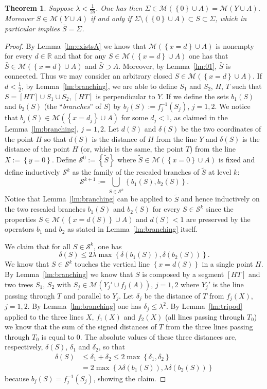 \documentclass{amsart}
\newcommand{\RR}{\mathbb R}
\newcommand{\ENCLOSE}[1]{\left\{#1\right\}}
\newcommand{\M}{\mathcal{M}}
\renewcommand{\S}{\mathcal{S}}
\newtheorem{theorem}{Theorem}[section]
\theoremstyle{definition}
\theoremstyle{remark}
\begin{document}
\begin{theorem}\label{th:main}
Suppose $\lambda < \frac 1{25}$.
One has then $\Sigma \in \M(\ENCLOSE{0}\cup A) = \M(Y\cup A)$.
Moreover $S\in \M(Y\cup A)$ if and only if 
$\Sigma\setminus (\ENCLOSE{0}\cup A)\subset S\subset \Sigma$,
which in particular implies $\bar S=\Sigma$.
\end{theorem}
%
\begin{proof}
By Lemma~\ref{lm:existsA} we know that $\M(\ENCLOSE{x=d}\cup A)$
is nonempty for every $d\in \RR$ and
that for any $S\in \M(\ENCLOSE{x=d}\cup A)$ 
one has that $\bar S\in \M(\ENCLOSE{x=d}\cup A)$ and $\bar S\supset A$.
Moreover, by Lemma~\ref{lm:01},
$\bar S$ is connected.
Thus we may consider an arbitrary closed $S\in \M(\ENCLOSE{x=d}\cup A)$.
If $d<\frac 1 2$, 
by Lemma~\ref{lm:branching}, 
we are able to define $S_1$ and $S_2$, $H$, $T$
such that 
$S=[H T] \cup S_1 \cup S_2$, $[HT]$ is perpendicular to $Y$.
If we define the sets $b_1(S)$ and $b_2(S)$ 
(the ``\emph{branches}'' of $S$) 
by $b_j(S) := f_j^{-1}(S_j)$, $j=1,2$.
We notice that $b_j(S)\in \M(\ENCLOSE{x=d_j}\cup A)$ for some $d_j<1$, 
as claimed in the Lemma~\ref{lm:branching}, $j=1,2$.
Let $d(S)$ and $\delta(S)$ be the two coordinates of the point $H$ 
so that $d(S)$ is the distance of $H$ from the line $Y$ 
and $\delta(S)$ is the distance of the point $H$
(or, which is the same, the point $T$) 
from the line $X:=\ENCLOSE{y=0}$.
Define $\S^0:=\ENCLOSE{\tilde S}$ where $\tilde S\in \M(\ENCLOSE{x=0}\cup A)$ 
is fixed
and define inductively $\S^k$ as the family of the rescaled branches of $\tilde S$ 
at level $k$:
\[
  \S^{k+1} := \bigcup_{S\in \S^k}\ENCLOSE{b_1(S),b_2(S)}.
\]
Notice that Lemma~\ref{lm:branching} can be applied to $\tilde S$ and 
hence inductively on the two rescaled branches 
$b_1(S)$ and $b_2(S)$ for every $S\in \S^k$
since the properties 
$S \in \M(\ENCLOSE{x=d(S)}\cup A)$ and $d(S)<1$
are preserved by the operators $b_1$ and $b_2$
as stated in Lemma~\ref{lm:branching} itself.

We claim that for all $S\in \S^k$, one has 
\[
  \delta(S)\le 2\lambda \max\ENCLOSE{\delta(b_1(S)),
    \delta(b_2(S))}.
\]
We know that $S\in \S^k$ touches the vertical line $\ENCLOSE{x=d(S)}$ 
in a single point $H$.
By Lemma~\ref{lm:branching} we know that $S$ is composed 
by a segment $[H T]$ and two trees $S_1$, $S_2$
with $S_j\in \M(Y_j'\cup f_j(A))$, $j=1,2$
where $Y_j'$ is the line passing through $T$ and parallel to $Y_j$.
Let $\delta_j$ be the distance of $T$ from $f_j(X)$, $j=1,2$.
By Lemma~\ref{lm:branching} one has $\delta_j \le \lambda^2$.
By Lemma~\ref{lm:tripod} applied to the three lines $X$, $f_1(X)$ and $f_2(X)$
(all lines passing through $T_0$) we know that the sum of the signed distances of $T$ from the three lines 
passing through $T_0$ is equal to $0$.
The absolute values of these three distances
are, respectively, $\delta(S)$, $\delta_1$ and $\delta_2$,
so that
\begin{align*}
  \delta(S) &\le \delta_1 + \delta_2 
    \le 2\max\ENCLOSE{\delta_1,\delta_2}\\
    &= 2\max\ENCLOSE{\lambda\delta(b_1(S)),\lambda\delta(b_2(S))}
  \end{align*}
because $b_j(S)=f_j^{-1}(S_j)$,
showing the claim.


\end{proof}
\end{document}
